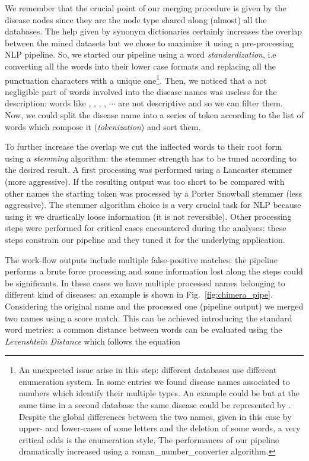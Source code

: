 \documentclass{standalone}
\begin{document}
We remember that the crucial point of our merging procedure is given by the disease nodes since they are the node type shared along (almost) all the databases.
The help given by synonym dictionaries certainly increases the overlap between the mined datasets but we chose to maximize it using a pre-processing NLP pipeline.
So, we started our pipeline using a word \emph{standardization}, i.e converting all the words into their lower case formats and replacing all the punctuation characters with a unique one\footnote{
  An unexpected issue arise in this step: different databases use different enumeration system.
  In some entries we found disease names associated to numbers which identify their multiple types.
  An example could be  but at the same time in a second database the same disease could be represented by .
  Despite the global differences between the two names, given in this case by upper- and lower-cases of some letters and the deletion of some words, a very critical odds is the enumeration style.
  The performances of our pipeline dramatically increased using a \textsf{roman\_number\_converter} algorithm.
}.
Then, we noticed that a not negligible part of words involved into the disease names was useless for the description: words like , , , , $\cdots$ are not descriptive and so we can filter them.
Now, we could split the disease name into a series of token according to the list of words which compose it (\emph{tokenization}) and sort them.

To further increase the overlap we cut the inflected words to their root form using a \emph{stemming} algorithm: the stemmer strength has to be tuned according to the desired result.
A first processing was performed using a \textsf{Lancaster} stemmer (more aggressive).
If the resulting output was too short to be compared with other names the starting token was processed by a \textsf{Porter Snowball} stemmer (less aggressive).
The stemmer algorithm choice is a very crucial task for NLP because using it we drastically loose information (it is not reversible).
Other processing steps were performed for critical cases encountered during the analyses: these steps constrain our pipeline and they tuned it for the underlying application.

The work-flow outputs include multiple false-positive matches: the pipeline performs a brute force processing and some information lost along the steps could be significants.
In these cases we have multiple processed names belonging to different kind of diseases: an example is shown in Fig.~\ref{fig:chimera_pipe}.
Considering the original name and the processed one (pipeline output) we merged two names using a score match.
This can be achieved introducing the standard word metrics: a common distance between words can be evaluated using the \emph{Levenshtein Distance} which follows the equation
\end{document}
